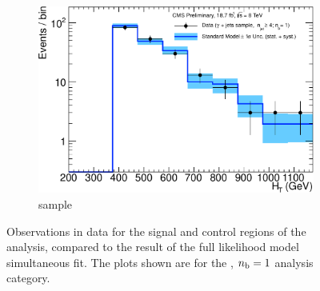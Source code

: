 \begin{figure}[h!]
\begin{subfigure}[b]{0.48\textwidth}
    \includegraphics[width=\textwidth]
    {Figs/results/v0/blueBand/single_plots/photon_1b_ge4j_logy.pdf}
    \caption{\gj sample}
  \end{subfigure}
  \caption{Observations in data for the signal and control
  regions of the analysis, compared to the result of the full likelihood model
  simultaneous fit. The plots shown are for the \njhigh, $n_{\text{b}} = 1$ analysis category.}
  \label{fig:blue_fits_1b_ge4j}
\end{figure}

